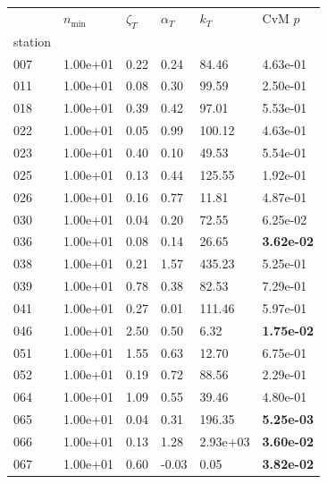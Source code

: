 \begin{figure}[htbp!]
    \centering
    {\footnotesize
    \begin{minipage}[t]{0.48\linewidth}
        \centering
        \begin{tabular}{llllll}
        \toprule
         & $n_{\min}$ & $\zeta_T$ & $\alpha_T$ & $k_T$ & CvM $p$ \\
        station &  &  &  &  &  \\
        \midrule
                    007 & 1.00e+01 & 0.22 & 0.24 & 84.46 & 4.63e-01\\
                    011 & 1.00e+01 & 0.08 & 0.30 & 99.59 & 2.50e-01\\
                    018 & 1.00e+01 & 0.39 & 0.42 & 97.01 & 5.53e-01\\
                    022 & 1.00e+01 & 0.05 & 0.99 & 100.12 & 4.63e-01\\
                    023 & 1.00e+01 & 0.40 & 0.10 & 49.53 & 5.54e-01\\
                    025 & 1.00e+01 & 0.13 & 0.44 & 125.55 & 1.92e-01\\
                    026 & 1.00e+01 & 0.16 & 0.77 & 11.81 & 4.87e-01\\
                    030 & 1.00e+01 & 0.04 & 0.20 & 72.55 & 6.25e-02\\
                    036 & 1.00e+01 & 0.08 & 0.14 & 26.65 & \textbf{3.62e-02}\\
                    038 & 1.00e+01 & 0.21 & 1.57 & 435.23 & 5.25e-01\\
                    039 & 1.00e+01 & 0.78 & 0.38 & 82.53 & 7.29e-01\\
                    041 & 1.00e+01 & 0.27 & 0.01 & 111.46 & 5.97e-01\\
                    046 & 1.00e+01 & 2.50 & 0.50 & 6.32 & \textbf{1.75e-02}\\
                    051 & 1.00e+01 & 1.55 & 0.63 & 12.70 & 6.75e-01\\
                    052 & 1.00e+01 & 0.19 & 0.72 & 88.56 & 2.29e-01\\
                    064 & 1.00e+01 & 1.09 & 0.55 & 39.46 & 4.80e-01\\
                    065 & 1.00e+01 & 0.04 & 0.31 & 196.35 & \textbf{5.25e-03}\\
                    066 & 1.00e+01 & 0.13 & 1.28 & 2.93e+03 & \textbf{3.60e-02}\\
                    067 & 1.00e+01 & 0.60 & -0.03 & 0.05 & \textbf{3.82e-02}\\

\end{tabular}
\end{minipage}}
\end{figure}
